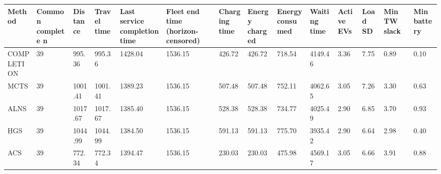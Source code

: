 \begin{tabular}{llllllllllllll}
\hline
Method & Common complete n & Distance & Travel time & Last service completion time & Fleet end time (horizon-censored) & Charging time & Energy charged & Energy consumed & Waiting time & Active EVs & Load SD & Min TW slack & Min battery \\
\hline
COMPLETION & 39 & 995.36 & 995.36 & 1428.04 & 1536.15 & 426.72 & 426.72 & 718.54 & 4149.46 & 3.36 & 7.75 & 0.89 & 0.10 \\
MCTS & 39 & 1001.41 & 1001.41 & 1389.23 & 1536.15 & 507.48 & 507.48 & 752.11 & 4062.65 & 3.05 & 7.26 & 3.30 & 0.63 \\
ALNS & 39 & 1017.67 & 1017.67 & 1385.40 & 1536.15 & 528.38 & 528.38 & 734.77 & 4025.49 & 2.90 & 6.85 & 3.70 & 0.93 \\
HGS & 39 & 1044.99 & 1044.99 & 1384.50 & 1536.15 & 591.13 & 591.13 & 775.70 & 3935.42 & 2.90 & 6.64 & 2.98 & 0.40 \\
ACS & 39 & 772.34 & 772.34 & 1394.47 & 1536.15 & 230.03 & 230.03 & 475.98 & 4569.17 & 3.05 & 6.66 & 3.91 & 0.88 \\
\hline
\end{tabular}
